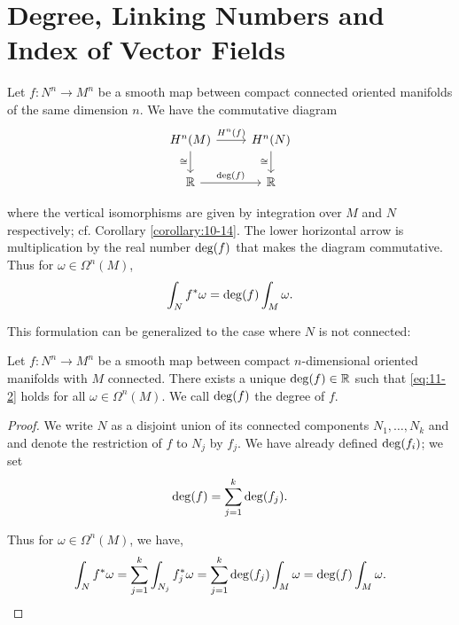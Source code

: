 \chapter{Degree, Linking Numbers and Index of Vector Fields}
Let $f:N^n\to M^n$ be a smooth map between compact connected oriented manifolds 
of the same dimension $n$. We have the commutative diagram
\begin{equation}\label{eq:11-1}
  \begin{tikzcd}
    H^n(M) \arrow[d, "\simee"']\rar{H^n(f)} & H^n(N)\arrow[d, "\simee"']\\
    \RR \rar{\R{deg}(f)} & \RR 
  \end{tikzcd}
\end{equation}

where the vertical isomorphisms are given by integration over $M$ and $N$ respectively; cf. 
Corollary \ref{corollary:10-14}. The lower horizontal arrow is multiplication by the
real number $\mathrm{deg}(f)$ that makes the diagram commutative. Thus for $\omega\in\Omega^n(M)$,
\begin{align}\label{eq:11-2}
  \int_N f^*\omega = \mathrm{deg}(f)\int_M \omega.
\end{align}

This formulation can be generalized to the case where $N$ is not connected:

\begin{proposition}\label{prop:11-1}
  Let $f:N^n\to M^n$ be a smooth map between compact $n$-dimensional oriented manifolds 
  with $M$ connected. There exists a unique $\mathrm{deg}(f)\in{\ensuremath{\mathbb{R}}}$ such that \eqref{eq:11-2} holds 
  for all $\omega\in\Omega^n(M)$. We call $\mathrm{deg}(f)$ the degree of $f$.
\end{proposition}

\begin{proof}
  We write $N$ as a disjoint union of its connected components $N_1, \ldots, N_k$ and
and denote the restriction of $f$ to $N_j$ by $f_j$. We have already defined $\mathrm{deg}(f_i)$;
we set
\begin{align}\label{eq:11-3}
  \mathrm{deg}(f) = \sum_{j=1}^{k }{\mathrm{deg}(f_j)}.
\end{align}

Thus for $\omega\in\Omega^n(M)$, we have, 
\begin{align*}
  \int_N f^*\omega 
  = \sum_{j=1}^{k}{\int_{N_j}f_j^*\omega} 
  = \sum_{j=1}^{k}{\mathrm{deg}(f_j)\int_M\omega} 
  = \mathrm{deg}(f)\int_M\omega.
\end{align*}
\end{proof}

